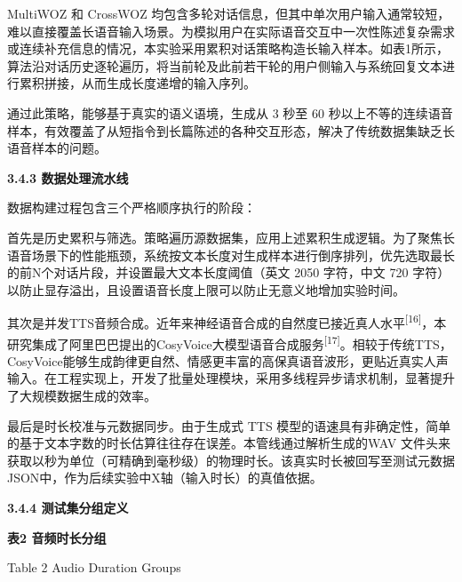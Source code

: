 \documentclass[
]{article}
\begin{document}
MultiWOZ 和 CrossWOZ 均包含多轮对话信息，但其中单次用户输入通常较短，难以直接覆盖长语音输入场景。为模拟用户在实际语音交互中一次性陈述复杂需求或连续补充信息的情况，本实验采用累积对话策略构造长输入样本。如表1所示，算法沿对话历史逐轮遍历，将当前轮及此前若干轮的用户侧输入与系统回复文本进行累积拼接，从而生成长度递增的输入序列。

通过此策略，能够基于真实的语义语境，生成从 3 秒至 60 秒以上不等的连续语音样本，有效覆盖了从短指令到长篇陈述的各种交互形态，解决了传统数据集缺乏长语音样本的问题。

\textbf{3.4.3 数据处理流水线}

数据构建过程包含三个严格顺序执行的阶段：

首先是历史累积与筛选。策略遍历源数据集，应用上述累积生成逻辑。为了聚焦长语音场景下的性能瓶颈，系统按文本长度对生成样本进行倒序排列，优先选取最长的前N个对话片段，并设置最大文本长度阈值（英文 2050 字符，中文 720 字符）以防止显存溢出，且设置语音长度上限可以防止无意义地增加实验时间。

其次是并发TTS音频合成。近年来神经语音合成的自然度已接近真人水平\textsuperscript{{[}16{]}}，本研究集成了阿里巴巴提出的CosyVoice大模型语音合成服务\textsuperscript{{[}17{]}}。相较于传统TTS，CosyVoice能够生成韵律更自然、情感更丰富的高保真语音波形，更贴近真实人声输入。在工程实现上，开发了批量处理模块，采用多线程异步请求机制，显著提升了大规模数据生成的效率。

最后是时长校准与元数据同步。由于生成式 TTS 模型的语速具有非确定性，简单的基于文本字数的时长估算往往存在误差。本管线通过解析生成的WAV 文件头来获取以秒为单位（可精确到毫秒级）的物理时长。该真实时长被回写至测试元数据JSON中，作为后续实验中X轴（输入时长）的真值依据。

\textbf{3.4.4 测试集分组定义}

\textbf{表2 音频时长分组}

Table 2 Audio Duration Groups
\end{document}
